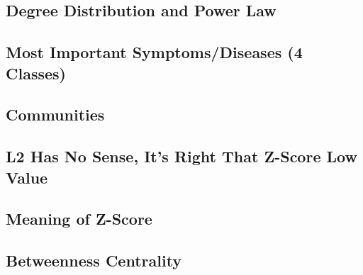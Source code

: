
\subsection{Degree Distribution and Power Law}


\subsection{Most Important Symptoms/Diseases (4 Classes)}


\subsection{Communities}


\subsection{L2 Has No Sense, It's Right That Z-Score Low Value}


\subsection{Meaning of Z-Score}


\subsection{Betweenness Centrality}


